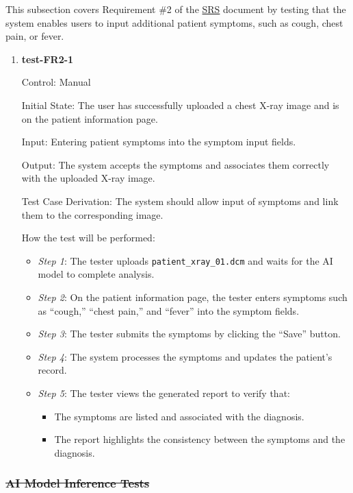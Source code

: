 \documentclass[12pt, titlepage]{article}
\begin{document}
This subsection covers Requirement \#2 of the \href{https://github.com/RezaJodeiri/CXR-Capstone/blob/main/docs/SRS/SRS.pdf}{SRS} \citep{SRS}
document by testing that the system enables users to input additional patient symptoms, such as cough, chest pain, or fever.

\begin{enumerate}

\item \textbf{test-FR2-1} \label{test-FR2-1}

Control: Manual

Initial State: The user has successfully uploaded a chest X-ray image and is on the patient information page.

Input: Entering patient symptoms into the symptom input fields.

Output: The system accepts the symptoms and associates them correctly with the uploaded X-ray image.

Test Case Derivation: The system should allow input of symptoms and link them to the corresponding image.

How the test will be performed: 
\begin{itemize}
  \item[-] \textit{Step 1}: The tester uploads \texttt{patient\_xray\_01.dcm} and waits for the AI model to complete analysis.
  \item[-] \textit{Step 2}: On the patient information page, the tester enters symptoms such as  ``cough,'' ``chest pain,'' and ``fever'' into the symptom fields.
  \item[-] \textit{Step 3}: The tester submits the symptoms by clicking the ``Save'' button.
  \item[-] \textit{Step 4}: The system processes the symptoms and updates the patient's record.
  \item[-] \textit{Step 5}: The tester views the generated report to verify that:
    \begin{itemize}
      \item The symptoms are listed and associated with the diagnosis.
      \item The report highlights the consistency between the symptoms and the diagnosis.
    \end{itemize}
  \end{itemize}

\end{enumerate}
\subsubsection{\texorpdfstring{\sout{AI Model Inference Tests}}{AI Model Inference Tests}}
\end{document}
